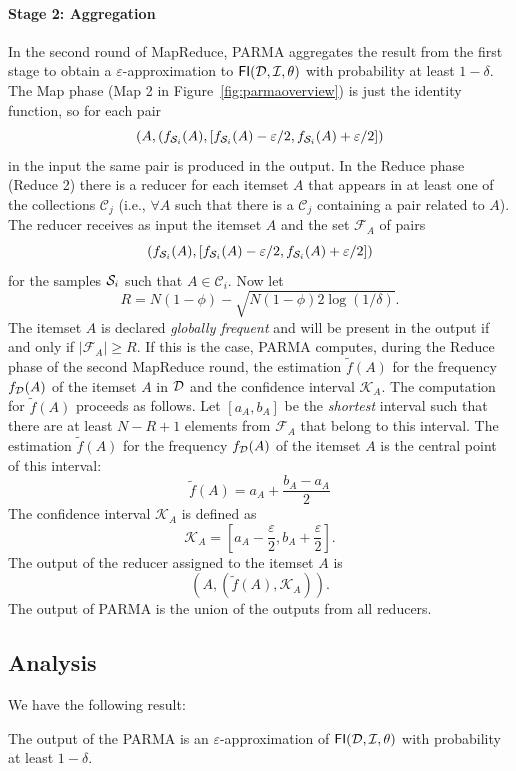 \paragraph*{Stage 2: Aggregation} In the second round of MapReduce, PARMA
aggregates the result from the first stage to obtain a
$\varepsilon$-approximation to $\mathsf{FI}({\cal D},{\cal I},\theta)$ with probability at least
$1-\delta$. The Map phase (Map 2 in Figure~\ref{fig:parmaoverview}) is just the identity
function, so for each pair 
\[(A,
(f_{{\cal S}_i}(A),[f_{{\cal S}_i}(A)-\varepsilon/2,f_{{\cal S}_i}(A)+\varepsilon/2])\]
in the input the same pair is produced in the output. In the Reduce phase (Reduce 2) there
is a reducer for each itemset $A$ that appears in at least one of the
collections $\mathcal{C}_j$ (i.e., $\forall A$ such that there is a
$\mathcal{C}_j$ containing a pair related to $A$). The reducer receives as input
the itemset $A$ and the set $\mathcal{F}_A$ of pairs
\[
(f_{{\cal S}_i}(A),[f_{{\cal S}_i}(A)-\varepsilon/2,f_{{\cal S}_i}(A)+\varepsilon/2])\]
for the samples ${\cal S}_i$ such that $A\in\mathcal{C}_i$.
Now let
\begin{equation}\label{eq:parmaRdef}
R = N(1-\phi)-\sqrt{N(1-\phi)2\log(1/\delta)}.
\end{equation}
The itemset $A$ is declared
\emph{globally frequent} and will be present in the output if and only if
$|\mathcal{F}_A| \ge R$. If this is the case, PARMA computes, during the Reduce
phase of the second MapReduce round, the estimation $\tilde{f}(A)$ for the
frequency $f_{\cal D}(A)$ of the itemset $A$ in ${\cal D}$ and the confidence interval
$\mathcal{K}_A$. The computation for $\tilde{f}(A)$ proceeds as follows. Let
$[a_A,b_A]$ be the \emph{shortest} interval such that
there are at least $N-R+1$ elements from $\mathcal{F}_A$ that belong to this
interval. The estimation $\tilde{f}(A)$ for the frequency $f_{\cal D}(A)$ of the
itemset $A$ is the central point of this interval:
\[ \tilde{f}(A)=a_A+\frac{b_A-a_A}{2}\]
The confidence interval $\mathcal{K}_A$ is defined as
\[ \mathcal{K}_A=\left[a_A-\frac{\varepsilon}{2},b_A+\frac{\varepsilon}{2}\right].\]
The output of the reducer assigned to the itemset $A$ is \[(A,(\tilde{f}(A),\mathcal{K}_A)).\]
The output of PARMA is the union of the outputs from all reducers.

\subsection{Analysis}
We have the following result:
\begin{lemma}\label{lem:multiepsapprox}
 The output of the PARMA is an $\varepsilon$-approximation of
 $\mathsf{FI}({\cal D},{\cal I},\theta)$ with probability at least $1-\delta$.
\end{lemma}

